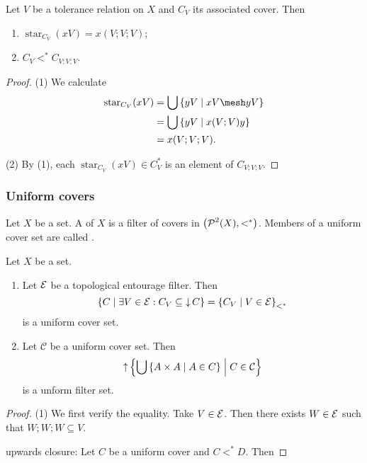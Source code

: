 \begin{lemma} \label{toleranceCoverStarRefinement}
Let $V$ be a tolerance relation on $X$ and $C_V$ its associated cover. Then
\begin{enumerate}
\item $\operatorname{star}_{C_V}(xV) = x(V;V;V)$;
\item $C_V <^* C_{V;V;V}$.
\end{enumerate}
\end{lemma}
\begin{proof}
(1) We calculate
\begin{align*}
\operatorname{star}_{C_V}(xV) &= \bigcup \setbuilder{yV}{xV\mesh yV} \\
&= \bigcup \setbuilder{yV}{x(V;V)y} \\
&= x(V;V;V).
\end{align*}

(2) By (1), each $\operatorname{star}_{C_V}(xV)\in C_V^*$ is an element of $C_{V;V;V}$.
\end{proof}

\subsubsection{Uniform covers}
\begin{definition}
Let $X$ be a set. A  of $X$ is a filter of covers in $\left( \operatorname{\mathcal{P}}^2(X), <^* \right)$. Members of a uniform cover set are called .
\end{definition}

\begin{proposition}
Let $X$ be a set.
\begin{enumerate}
\item Let $\operatorname{\mathcal{E}}$ be a topological entourage filter. Then
\[ \left\{ C \;\middle|\; \exists V\in\operatorname{\mathcal{E}}: C_V\subseteq \operatorname{\downarrow} C \right\} = \left\{ C_V \;\middle|\; V\in\operatorname{\mathcal{E}} \right\}_{<^*} \]
is a uniform cover set.
\item Let $\mathcal{C}$ be a uniform cover set. Then
\[ \operatorname{\uparrow} \left\{ \bigcup\left\{ A\times A \;\middle|\; A\in C \right\} \;\middle|\; C\in\mathcal{C} \right\} \]
is a unform filter set.
\end{enumerate}
\end{proposition}
\begin{proof}
(1) We first verify the equality. Take $V\in \operatorname{\mathcal{E}}$. Then there exists $W\in \operatorname{\mathcal{E}}$ such that $W;W;W\subseteq V$.


upwards closure: Let $C$ be a uniform cover and $C <^* D$. Then 
\end{proof}




